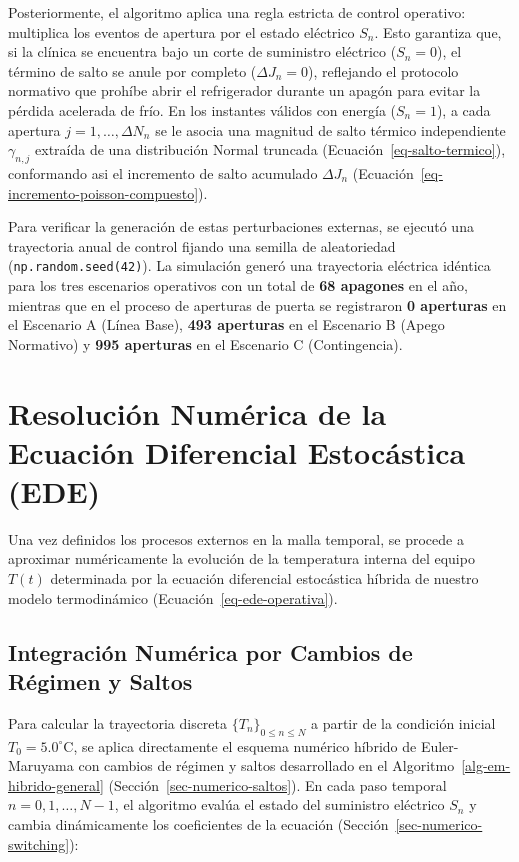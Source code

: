 \documentclass[
  spanish,
  us-letterpaper,
]{scrreprt}
\numberwithin{equation}{section}
\theoremstyle{plain}
\theoremstyle{plain}
\theoremstyle{definition}
\theoremstyle{plain}
\theoremstyle{remark}
\begin{document}
Posteriormente, el algoritmo aplica una regla estricta de control
operativo: multiplica los eventos de apertura por el estado eléctrico
\(S_n\). Esto garantiza que, si la clínica se encuentra bajo un corte de
suministro eléctrico (\(S_n = 0\)), el término de salto se anule por
completo (\(\Delta J_n = 0\)), reflejando el protocolo normativo que
prohíbe abrir el refrigerador durante un apagón para evitar la pérdida
acelerada de frío. En los instantes válidos con energía (\(S_n = 1\)), a
cada apertura \(j = 1, \dots, \Delta N_n\) se le asocia una magnitud de
salto térmico independiente \(\gamma_{n, j}\) extraída de una
distribución Normal truncada (Ecuación~\ref{eq-salto-termico}),
conformando asi el incremento de salto acumulado \(\Delta J_n\)
(Ecuación~\ref{eq-incremento-poisson-compuesto}).

Para verificar la generación de estas perturbaciones externas, se
ejecutó una trayectoria anual de control fijando una semilla de
aleatoriedad (\texttt{np.random.seed(42)}). La simulación generó una
trayectoria eléctrica idéntica para los tres escenarios operativos con
un total de \textbf{68 apagones} en el año, mientras que en el proceso
de aperturas de puerta se registraron \textbf{0 aperturas} en el
Escenario A (Línea Base), \textbf{493 aperturas} en el Escenario B
(Apego Normativo) y \textbf{995 aperturas} en el Escenario C
(Contingencia).

\section{Resolución Numérica de la Ecuación Diferencial Estocástica
(EDE)}\label{resoluciuxf3n-numuxe9rica-de-la-ecuaciuxf3n-diferencial-estocuxe1stica-ede}

Una vez definidos los procesos externos en la malla temporal, se procede
a aproximar numéricamente la evolución de la temperatura interna del
equipo \(T(t)\) determinada por la ecuación diferencial estocástica
híbrida de nuestro modelo termodinámico
(Ecuación~\ref{eq-ede-operativa}).

\subsection{Integración Numérica por Cambios de Régimen y
Saltos}\label{integraciuxf3n-numuxe9rica-por-cambios-de-ruxe9gimen-y-saltos}

Para calcular la trayectoria discreta \(\{T_n\}_{0 \le n \le N}\) a
partir de la condición inicial \(T_0 = 5.0^\circ\text{C}\), se aplica
directamente el esquema numérico híbrido de Euler-Maruyama con cambios
de régimen y saltos desarrollado en el
Algoritmo~\ref{alg-em-hibrido-general}
(Sección~\ref{sec-numerico-saltos}). En cada paso temporal
\(n = 0, 1, \dots, N - 1\), el algoritmo evalúa el estado del suministro
eléctrico \(S_n\) y cambia dinámicamente los coeficientes de la ecuación
(Sección~\ref{sec-numerico-switching}):
\end{document}
